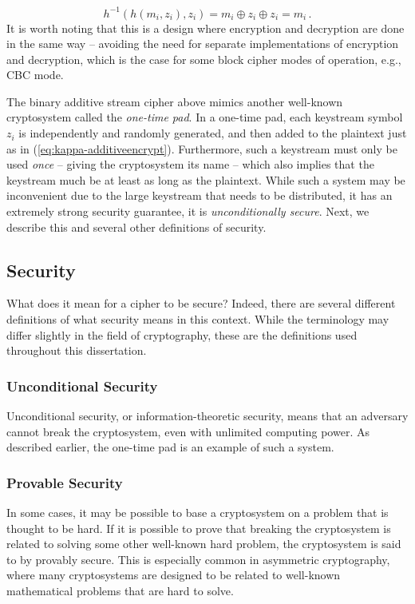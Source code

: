 \begin{equation}
	h^{-1}( h(m_i, z_i), z_i) = m_i \oplus z_i \oplus z_i = m_i \,.
\end{equation}
It is worth noting that this is a design where encryption and decryption are done in the same way -- avoiding the need for separate implementations of encryption and decryption, which is the case for some block cipher modes of operation, e.g., CBC mode.

The binary additive stream cipher above mimics another well-known cryptosystem called the \emph{one-time pad}.
In a one-time pad, each keystream symbol $z_i$ is independently and randomly generated, and then added to the plaintext just as in (\ref{eq:kappa-additiveencrypt}).
Furthermore, such a keystream must only be used \emph{once} -- giving the cryptosystem its name -- which also implies that the keystream much be at least as long as the plaintext.
While such a system may be inconvenient due to the large keystream that needs to be distributed, it has an extremely strong security guarantee, it is \emph{unconditionally secure}.
Next, we describe this and several other definitions of security.

\subsection{Security}

What does it mean for a cipher to be secure?
Indeed, there are several different definitions of what security means in this context.
While the terminology may differ slightly in the field of cryptography, these are the definitions used throughout this dissertation.

\subsubsection{Unconditional Security}

Unconditional security, or information-theoretic security, means that an adversary cannot break the cryptosystem, even with unlimited computing power.
As described earlier, the one-time pad is an example of such a system.

\subsubsection{Provable Security}

In some cases, it may be possible to base a cryptosystem on a problem that is thought to be hard.
If it is possible to prove that breaking the cryptosystem is related to solving some other well-known hard problem, the cryptosystem is said to by provably secure.
This is especially common in asymmetric cryptography, where many cryptosystems are designed to be related to well-known mathematical problems that are hard to solve.

